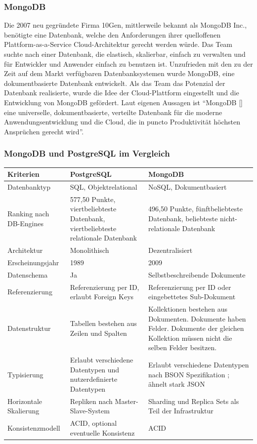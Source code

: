 \subsubsection{MongoDB}
Die 2007 neu gegründete Firma 10Gen, mittlerweile bekannt als MongoDB Inc., benötigte eine Datenbank, welche den Anforderungen ihrer quelloffenen Plattform-as-a-Service Cloud-Architektur gerecht werden würde. Das Team suchte nach einer Datenbank, die elastisch, skalierbar, einfach zu verwalten und für Entwickler und Anwender einfach zu benutzen ist. Unzufrieden mit den zu der Zeit auf dem Markt verfügbaren Datenbanksystemen wurde MongoDB, eine dokumentbasierte Datenbank entwickelt. Als das Team das Potenzial der Datenbank realisierte, wurde die Idee der Cloud-Plattform eingestellt und die Entwicklung von MongoDB gefördert.\cite{MG1}
Laut eigenen Aussagen ist \enquote{MongoDB [] eine universelle, dokumentbasierte, verteilte Datenbank für die moderne Anwendungsentwicklung und die Cloud, die in puncto Produktivität höchsten Ansprüchen gerecht wird}. \cite{MG2} 


\subsubsection{MongoDB und PostgreSQL im Vergleich}

\begin{center}
    \begin{tabularx}{\linewidth}{ |X|X|X| } 
     \hline
     Kriterien & PostgreSQL & MongoDB  \\ 
     \hline
     Datenbanktyp & SQL, Objektrelational & NoSQL, Dokumentbasiert \\
     Ranking nach DB-Engines \cite{DB1} & 577,50 Punkte, viertbeliebteste Datenbank, viertbeliebteste relationale Datenbank & 496,50 Punkte, fünftbeliebteste Datenbank, beliebteste nicht-relationale Datenbank \cite{DB2} \\
     Architektur & Monolithisch & Dezentralisiert \\
     Erscheinungsjahr & 1989 & 2009 \\
     Datenschema & Ja & Selbstbeschreibende Dokumente\\
     Referenzierung & Referenzierung per ID, erlaubt Foreign Keys & Referenzierung per ID oder eingebettetes Sub-Dokument \\
     Datenstruktur & Tabellen bestehen aus Zeilen und Spalten & Kollektionen bestehen aus Dokumenten. Dokumente haben Felder. Dokumente der gleichen Kollektion müssen nicht die selben Felder besitzen. \\
     Typisierung & Erlaubt verschiedene Datentypen und nutzerdefinierte Datentypen\cite{PG5} & Erlaubt verschiedene Datentypen nach BSON Spezifikation \cite{MG3}; ähnelt stark JSON \\
     Horizontale Skalierung & Repliken nach Master-Slave-System \cite{PG6} & Sharding und Replica Sets als Teil der Infrastruktur \cite{MG4} \cite{MG5} \\
     Konsistenzmodell & ACID, optional eventuelle Konsistenz \cite{MG6} \cite{MG7} & ACID \\
     \hline
    \end{tabularx}
    \cite{DB3} \cite{DB4}
\end{center}

